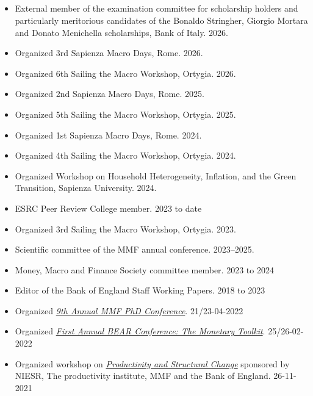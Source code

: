 \documentclass[margin, 11pt]{res} %
\begin{document}
\begin{resume}
\section{}
\begin{itemize}
\item External member of the examination committee for scholarship holders and particularly meritorious candidates of the Bonaldo Stringher, Giorgio Mortara and Donato Menichella scholarships, Bank of Italy. \hfill 2026.
\item Organized 3rd Sapienza Macro Days, Rome. \hfill 2026.
\item Organized 6th Sailing the Macro Workshop, Ortygia. \hfill 2026.
\item Organized 2nd Sapienza Macro Days, Rome. \hfill 2025.
\item Organized 5th Sailing the Macro Workshop, Ortygia. \hfill 2025.
\item Organized 1st Sapienza Macro Days, Rome. \hfill 2024.
\item Organized 4th Sailing the Macro Workshop, Ortygia. \hfill 2024.
\item Organized Workshop on Household Heterogeneity, Inflation, and the Green Transition, Sapienza University. \hfill 2024.
\item ESRC Peer Review College member. \hfill 2023 to date 
\item Organized 3rd Sailing the Macro Workshop, Ortygia. \hfill 2023.
\item Scientific committee of the MMF annual conference. \hfill 2023--2025.
\item Money, Macro and Finance Society committee member. \hfill 2023 to 2024 
\item Editor of the Bank of England Staff Working Papers. \hfill 2018 to 2023
\item Organized \emph{\href{https://www.mmf.ac.uk/phd/2022-phd-conference/}{9th Annual MMF PhD Conference}}. \hfill 21/23-04-2022
\item Organized \emph{\href{https://www.bankofengland.co.uk/events/2022/february/first-annual-bear-conference}{First Annual BEAR Conference: The Monetary Toolkit}}. \hfill 25/26-02-2022
\item Organized workshop on \emph{\href{https://www.mmf.ac.uk/productivity-workshop/}{Productivity and Structural Change}} sponsored by NIESR, The productivity institute, MMF and the Bank of England. \hfill 26-11-2021

\end{itemize}
\end{resume}
\end{document}
